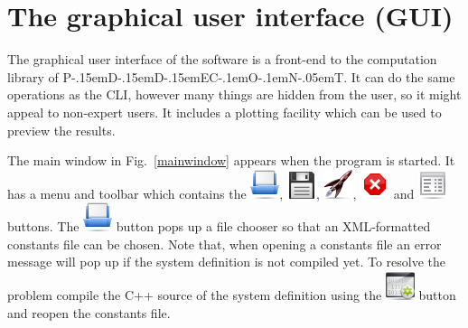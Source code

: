 \documentclass[10pt,a4paper]{ddedoc}
\def\knut{{P\kern-.15emD\kern-.15emD\kern-.15emE\raisebox{.25ex}{-}C\kern-.1emO\kern-.1emN\kern-.05emT}}
\newcommand{\iconRun}{\protect\includegraphics[height=0.8\baselineskip]{fig/cr32-action-launch}}
\newcommand{\iconStop}{\protect\includegraphics[height=0.8\baselineskip]{fig/cr32-action-stop}}
\newcommand{\iconBuild}{\protect\includegraphics[height=0.8\baselineskip]{fig/cr32-action-build}}
\newcommand{\iconText}{\protect\includegraphics[height=0.8\baselineskip]{fig/cr32-action-view_text}}
\newcommand{\iconOpen}{\protect\includegraphics[height=0.8\baselineskip]{fig/cr32-action-fileopen}}
\newcommand{\iconSave}{\protect\includegraphics[height=0.8\baselineskip]{fig/cr32-action-filesave}}
\begin{document}
\section{The graphical user interface (GUI)}

The graphical user interface of the software is a front-end to the computation
library of \knut{}. It can do the same operations as the CLI, however many things are
hidden from the user, so it might appeal to non-expert users. It includes a plotting
facility which can be used to preview the results.

The main window in Fig.\ \ref{mainwindow} appears
when the program  is started.
It has a menu and toolbar which 
contains the  \iconOpen{},  \iconSave{},
 \iconRun{},  \iconStop{} and
 \iconText{} buttons. The  \iconOpen{} button pops up a
file chooser so that an XML-formatted constants file can be chosen. Note that, when opening a constants file an error message will pop up if
the system definition is not compiled yet. To resolve the problem compile the C++ source
of the system definition using the  \iconBuild{} button and reopen the constants file.
\end{document}
